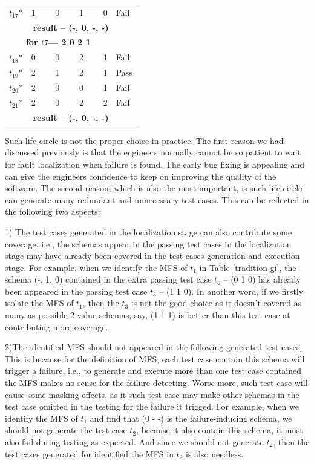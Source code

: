 \documentclass{sig-alternate}
\begin{document}
\begin{table}[h]
\begin{tabular}{llllll}
$t_{17}$* &\multicolumn{4}{l}{1  \ \ \ \  0 \ \ \ \  1  \ \ \ \ 0} & Fail \\
\multicolumn{6}{c}{\bfseries result --  (-, 0, -, -)}  \\
\multicolumn{5}{c}{\bfseries for $t7$--- 2 0 2 1} &  \\
$t_{18}$* &\multicolumn{4}{l}{0  \ \ \ \  0 \ \ \ \  2 \ \ \ \  1} & Fail \\
$t_{19}$* &\multicolumn{4}{l}{2  \ \ \ \  1 \ \ \ \  2 \ \ \ \  1} & Pass \\
$t_{20}$* &\multicolumn{4}{l}{2  \ \ \ \  0 \ \ \ \  0  \ \ \ \ 1} & Fail \\
$t_{21}$* &\multicolumn{4}{l}{2  \ \ \ \  0 \ \ \ \  2  \ \ \ \ 2} & Fail \\
\multicolumn{6}{c}{\bfseries result --  (-, 0, -, -)}  \\
\hline
\end{tabular}
\end{table}

Such life-circle is not the proper choice in practice. The first reason we had discussed previously is that the engineers normally cannot be so patient to wait for fault localization when failure is found. The early bug fixing is appealing and can give the engineers confidence to keep on improving the quality of the software. The second reason, which is also the most important, is such life-circle can generate many redundant and unnecessary test cases. This can be reflected in the following two aspects:

1) The test cases generated in the localization stage can also contribute some coverage, i.e.,  the schemas appear in the passing test cases in the localization stage may have already been covered in the test cases generation and execution stage.  For example, when we identify the MFS of $t_{1}$ in Table \ref{tradition-gi}, the schema (-, 1, 0) contained in the extra passing test case $t_{6}$ -- (0 1 0) has already been appeared in the passing test case $t_{3}$ -- (1 1 0). In another word, if we firstly isolate the MFS of $t_{1}$, then the $t_{3}$ is not the good choice as it doesn't covered as many as possible 2-value schemas, say, (1 1 1) is better than this test case at contributing more coverage.

2)The identified MFS should not appeared in the following generated test cases.  This is because for the definition of MFS, each test case contain this schema will trigger a failure, i.e., to generate and execute more than one test case contained the MFS makes no sense for the failure detecting. Worse more, such test case will cause some masking effects, as it such test case may make other schemas in the test case omitted in the testing for the failure it trigged.  For example, when we identify the MFS of $t_{1}$ and find that (0 - -) is the failure-inducing schema, we should not generate the test case $t_{2}$, because it also contain this schema, it must also fail during testing as expected. And since we should not generate $t_{2}$, then the test cases generated for identified the MFS in $t_{2}$ is also needless.
\end{document}
